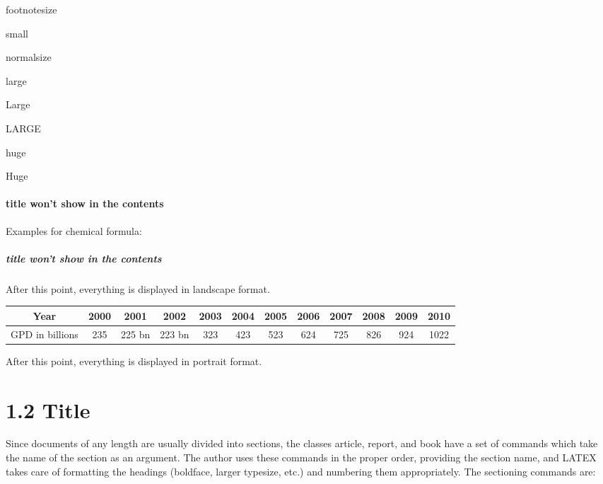\documentclass[12pt,openright]{book}
\begin{document}
{\footnotesize footnotesize}

{\small small}

{\normalsize normalsize}

{\large large}

{\Large Large}

{\LARGE LARGE}

{\huge huge}

{\Huge Huge}

\paragraph{title won't show in the contents} 

Examples for chemical formula:

\vskip 0.1in





\vskip 0.1in

\subparagraph{title won't show in the contents}

\begin{landscape}
  After this point, everything is displayed in landscape format.
  
  \begin{tabular}{|c|c|c|c|c|c|c|c|c|c|c|c|}
    \hline
    Year & 2000 & 2001 & 2002 & 2003 & 2004 & 2005 & 2006 & 2007 & 2008 & 2009 & 2010 \\
    \hline 
    GPD in billions & 235  &  225 bn & 223 bn & 323 & 423  & 523 & 624 & 725 & 826  & 924  & 1022  \\
    \hline 
  \end{tabular}
\end{landscape}

After this point, everything is displayed in portrait format.

\section{1.2 Title}

Since documents of any length are usually divided into sections, the classes article, report, and book have a set of commands which take the name of the section as an argument. The author uses these commands in the proper order, providing the section name, and LATEX takes care of formatting the headings (boldface, larger typesize, etc.) and numbering them appropriately. The sectioning commands are:
\end{document}
